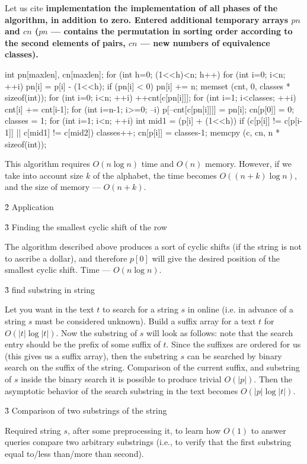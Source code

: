 Let us cite \bf{implementation} the implementation of all phases of the algorithm, in addition to zero. Entered additional temporary arrays $pn$ and $cn$ ($pn$ --- contains the permutation in sorting order according to the second elements of pairs, $cn$ --- new numbers of equivalence classes).

\code
int pn[maxlen], cn[maxlen];
for (int h=0; (1<<h)<n; h++) {
for (int i=0; i<n; ++i) {
pn[i] = p[i] - (1<<h);
if (pn[i] < 0) pn[i] += n;
}
memset (cnt, 0, classes * sizeof(int));
for (int i=0; i<n; ++i)
++cnt[c[pn[i]]];
for (int i=1; i<classes; ++i)
cnt[i] += cnt[i-1];
for (int i=n-1; i>=0; --i)
p[--cnt[c[pn[i]]]] = pn[i];
cn[p[0]] = 0;
classes = 1;
for (int i=1; i<n; ++i) {
int mid1 = (p[i] + (1<<h)) %
if (c[p[i]] != c[p[i-1]] || c[mid1] != c[mid2])
classes++;
cn[p[i]] = classes-1;
}
memcpy (c, cn, n * sizeof(int));
}
\endcode

This algorithm requires $O(n \log n)$ time and $O(n)$ memory. However, if we take into account size $k$ of the alphabet, the time becomes $O((n+k) \log n)$, and the size of memory --- $O(n+k)$.


\h2{ Application }


\h3{ Finding the smallest cyclic shift of the row }

The algorithm described above produces a sort of cyclic shifts (if the string is not to ascribe a dollar), and therefore $p[0]$ will give the desired position of the smallest cyclic shift. Time --- $O(n \log n)$.


\h3{ find substring in string }

Let you want in the text $t$ to search for a string $s$ in online (i.e. in advance of a string $s$ must be considered unknown). Build a suffix array for a text $t$ for $O (|t| \log |t|)$. Now the substring of $s$ will look as follows: note that the search entry should be the prefix of some suffix of $t$. Since the suffixes are ordered for us (this gives us a suffix array), then the substring $s$ can be searched by binary search on the suffix of the string. Comparison of the current suffix, and substring of $s$ inside the binary search it is possible to produce trivial $O(|p|)$. Then the asymptotic behavior of the search substring in the text becomes $O(|p| \log |t|)$.


\h3{ Comparison of two substrings of the string }

Required string $s$, after some preprocessing it, to learn how $O(1)$ to answer queries compare two arbitrary substrings (i.e., to verify that the first substring equal to/less than/more than second).

